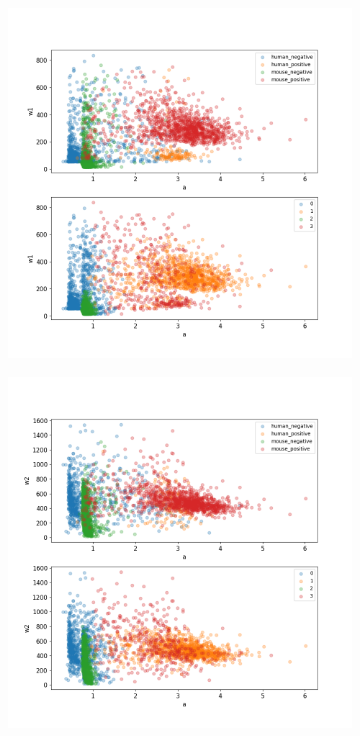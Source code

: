 \begin{figure}
\begin{subfigure}{0.3\textwidth}
	\end{subfigure}
	\hfill
	\begin{subfigure}{0.3\textwidth}
		\includegraphics[width=\textwidth]{fig/seperate_a_w1}
	\end{subfigure}
	\hfill
	\begin{subfigure}{0.3\textwidth}
		\includegraphics[width=\textwidth]{fig/seperate_a_w2}

\end{subfigure}
\end{figure}
